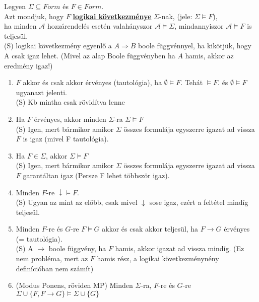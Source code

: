 \begin{frame}
\begin{tcolorbox}[title={Def.: Logikai következmény}]
Legyen $\Sigma \subseteq Form$ és $F \in Form$.\\
Azt mondjuk, hogy $F$ \underline{\textbf{logikai következménye}} $\Sigma$-nak, (jele: $\Sigma \models F$),\\
ha minden $\mathcal{A}$ hozzárendelés esetén valahányszor $\mathcal{A} \models \Sigma$, mindannyiszor $\mathcal{A} \models F$ is teljesül.\\
{\tiny (S) logikai következmény egyenlő a $A \Rightarrow B$ boole függvénnyel, ha kikötjük, hogy A csak igaz lehet. (Mivel az alap Boole függvényben ha $A$ hamis, akkor az eredmény igaz!)}
\end{tcolorbox}
\mmedskip
\begin{tcolorbox}[title={Ész}]
\begin{enumerate}
\item $F$ akkor és csak akkor érvényes (tautológia), ha $\emptyset \models F$. Tehát $\models F$. és $\emptyset \models F$ ugyanazt jelenti.\\
{\tiny (S) Kb mintha csak rövidítva lenne}\\
\item Ha $F$ érvényes, akkor minden $\Sigma$-ra $\Sigma \models F$\\
{\tiny (S) Igen, mert bármikor amikor $\Sigma$ összes formulája egyszerre igazat ad vissza $F$ is igaz (mivel F tautológia).}\\
\item Ha $F \in \Sigma$, akkor $\Sigma \models F$\\
{\tiny (S) Igen, mert bármikor amikor $\Sigma$ összes formulája egyszerre igazat ad vissza $F$ garantáltan igaz (Persze F lehet többször igaz).}\\
\item Minden $F$-re $\downarrow \models F$.\\
{\tiny (S) Ugyan az mint az előbb, csak mivel $\downarrow$ sose igaz, ezért a feltétel mindíg teljesül.}\\
\item Minden $F$-re és $G$-re $F \models G$ akkor és csak akkor teljesül, ha $F \rightarrow G$ érvényes (= tautológia).\\
{\tiny (S) A $\rightarrow$ boole függvény, ha $F$ hamis, akkor igazat ad vissza mindíg. (Ez nem probléma, mert az $F$ hamis rész, a logikai következménynény definícióban nem számít)}\\
\item (Modus Ponens, röviden MP) Minden $\Sigma$-ra, $F$-re és $G$-re $\Sigma \cup \{F, F \rightarrow G\} \models \Sigma \cup \{G\}$\\

\end{enumerate}
\end{tcolorbox}
\end{frame}
